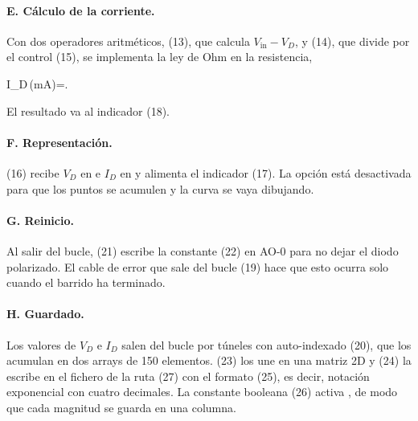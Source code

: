 \documentclass[10pt,a4paper]{article}
\begin{document}
\paragraph{E. Cálculo de la corriente.} Con dos operadores aritméticos,
 (13), que calcula $V_{\text{in}}-V_D$, y  (14), que
divide por el control  (15), se implementa la ley de Ohm en la
resistencia,
\begin{destacada}
  I_D\,(\si{mA})=.
  \label{eq:ohm}
\end{destacada}
El resultado va al indicador  (18).

\paragraph{F. Representación.}  (16) recibe $V_D$ en
 e $I_D$ en  y alimenta el indicador 
(17). La opción  está desactivada para que los
puntos se acumulen y la curva se vaya dibujando.

\paragraph{G. Reinicio.} Al salir del bucle,  (21) escribe
la constante  (22) en AO-0 para no dejar el diodo polarizado. El cable de
error que sale del bucle (19) hace que esto ocurra solo cuando el barrido ha
terminado.

\paragraph{H. Guardado.} Los valores de $V_D$ e $I_D$ salen del bucle por
túneles con auto-indexado (20), que los acumulan en dos arrays de 150
elementos.  (23) los une en una matriz 2D y  (24) la escribe en el fichero de la ruta 
(27) con el formato  (25), es decir, notación exponencial con cuatro
decimales. La constante booleana  (26) activa , de modo
que cada magnitud se guarda en una columna.
\end{document}
